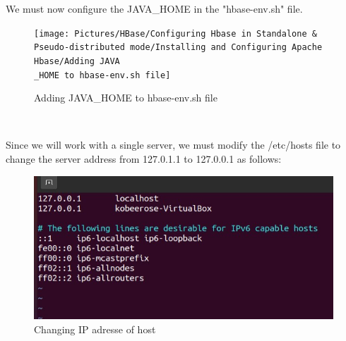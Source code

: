 \begin{spacing}{1.2}
\par We must now configure the JAVA\_HOME in the "hbase-env.sh" file.
\\
\begin{figure}[!htb] 
\begin{center} 
\texttt{[image: Pictures/HBase/Configuring Hbase in Standalone \& Pseudo-distributed mode/Installing and Configuring Apache Hbase/Adding JAVA\\\_HOME to hbase-env.sh file]} 
\end{center} 
\caption{Adding JAVA\_HOME to hbase-env.sh file} 
\end{figure}  \FloatBarrier
\\
\newpage
\par Since we will work with a single server, we must modify the /etc/hosts file to change the server address from 127.0.1.1 to 127.0.0.1 as follows:
\\
\begin{figure}[!htb] 
\begin{center} 
\includegraphics[width=1\linewidth]{Pictures/HBase/Configuring Hbase in Standalone & Pseudo-distributed mode/Installing and Configuring Apache Hbase/Changing IP adresse of host} 
\end{center} 
\caption{Changing IP adresse of host} 
\end{figure}  \FloatBarrier
\\


\end{spacing}
